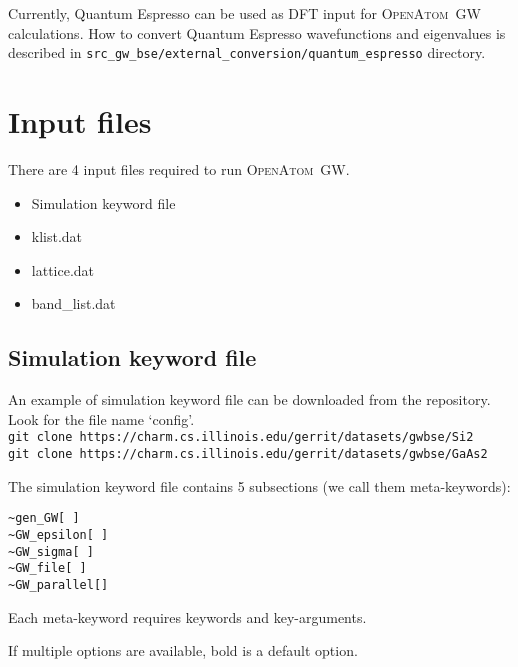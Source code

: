\documentclass[letterpaper,12pt]{article}
\title{\fontfamily{phv}\selectfont{\openatom\ for GW calculations}}
\date{}
\newcommand{\openatom}{\textsc{OpenAtom}}
\newcommand{\red}{\color{red}}
\newcommand{\black}{\color{black}}
\begin{document}
 \maketitle

Currently, Quantum Espresso can be used as DFT input for \openatom\ GW calculations.
How to convert Quantum Espresso wavefunctions and eigenvalues is described in \verb+src_gw_bse/external_conversion/quantum_espresso+ directory. 


\section{Input files}

There are 4 input files required to run \openatom\ GW. 
\begin{itemize}
\item Simulation keyword file
\item klist.dat
\item lattice.dat
\item band\_list.dat
\end{itemize}


\subsection{Simulation keyword file}

An example of simulation keyword file can be downloaded from the repository. Look for the file name `config'.\\
\verb+git clone https://charm.cs.illinois.edu/gerrit/datasets/gwbse/Si2+ 
\\
\verb+git clone https://charm.cs.illinois.edu/gerrit/datasets/gwbse/GaAs2+
\black

The simulation keyword file contains 5 subsections (we call them meta-keywords):
\begin{verbatim}
~gen_GW[ ]
~GW_epsilon[ ]
~GW_sigma[ ]
~GW_file[ ]
~GW_parallel[]
\end{verbatim}

Each meta-keyword requires keywords and key-arguments. 

If multiple options are available, bold is a default option.

\newpage
\end{document}

